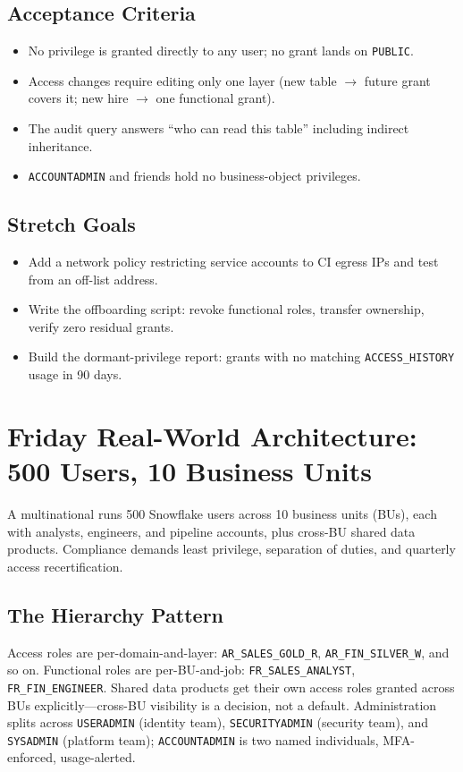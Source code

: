 \subsection*{Acceptance Criteria}
\begin{itemize}
    \item No privilege is granted directly to any user; no grant lands on \texttt{PUBLIC}.
    \item Access changes require editing only one layer (new table $\rightarrow$ future grant covers it; new hire $\rightarrow$ one functional grant).
    \item The audit query answers ``who can read this table'' including indirect inheritance.
    \item \texttt{ACCOUNTADMIN} and friends hold no business-object privileges.
\end{itemize}

\subsection*{Stretch Goals}
\begin{itemize}
    \item Add a network policy restricting service accounts to CI egress IPs and test from an off-list address.
    \item Write the offboarding script: revoke functional roles, transfer ownership, verify zero residual grants.
    \item Build the dormant-privilege report: grants with no matching \texttt{ACCESS\_HISTORY} usage in 90 days.
\end{itemize}

\section{Friday Real-World Architecture: 500 Users, 10 Business Units}
A multinational runs 500 Snowflake users across 10 business units (BUs), each with analysts, engineers, and pipeline accounts, plus cross-BU shared data products. Compliance demands least privilege, separation of duties, and quarterly access recertification.

\subsection{The Hierarchy Pattern}
Access roles are per-domain-and-layer: \texttt{AR\_SALES\_GOLD\_R}, \texttt{AR\_FIN\_SILVER\_W}, and so on. Functional roles are per-BU-and-job: \texttt{FR\_SALES\_ANALYST}, \texttt{FR\_FIN\_ENGINEER}. Shared data products get their own access roles granted across BUs explicitly---cross-BU visibility is a decision, not a default. Administration splits across \texttt{USERADMIN} (identity team), \texttt{SECURITYADMIN} (security team), and \texttt{SYSADMIN} (platform team); \texttt{ACCOUNTADMIN} is two named individuals, MFA-enforced, usage-alerted.

